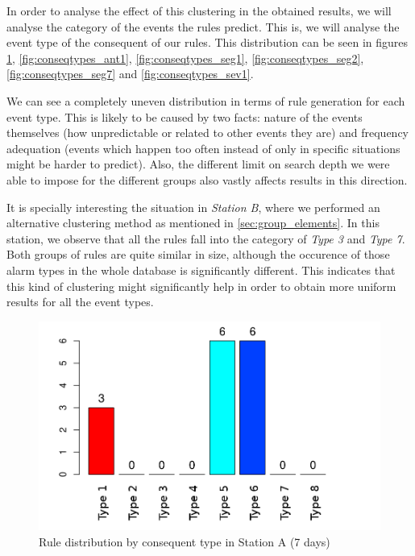 In order to analyse the effect of this clustering in the obtained results, we will analyse the category of the events the rules predict. This is, we will analyse the event type of the consequent of our rules. This distribution can be seen in figures \ref{fig:conseqtypes_alb7}, \ref{fig:conseqtypes_ant1}, \ref{fig:conseqtypes_seg1}, \ref{fig:conseqtypes_seg2}, \ref{fig:conseqtypes_seg7} and \ref{fig:conseqtypes_sev1}.

We can see a completely uneven distribution in terms of rule generation for each event type. This is likely to be caused by two facts: nature of the events themselves (how unpredictable or related to other events they are) and frequency adequation (events which happen too often instead of only in specific situations might be harder to predict). Also, the different limit on search depth we were able to impose for the different groups also vastly affects results in this direction.

It is specially interesting the situation in \emph{Station B}, where we performed an alternative clustering method as mentioned in \ref{sec:group_elements}. In this station, we observe that all the rules fall into the category of \emph{Type 3} and \emph{Type 7}. Both groups of rules are quite similar in size, although the occurence of those alarm types in the whole database is significantly different. This indicates that this kind of clustering might significantly help in order to obtain more uniform results for all the event types.

\begin{figure}[hbtp]
\includegraphics[width=\textwidth]{img/conseqtypes_alb7.png}
\caption{Rule distribution by consequent type in Station A (7 days)} \label{fig:conseqtypes_alb7}
\end{figure}

